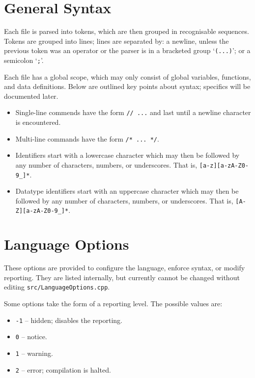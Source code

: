 \documentclass{article}
\begin{document}
\section{General Syntax}

Each file is parsed into tokens, which are then grouped in recognisable sequences.
Tokens are grouped into lines; lines are separated by: a newline, unless the previous token was an operator or the parser is in a bracketed group `\texttt{(...)}';
or a semicolon `\texttt{;}'.

Each file has a global scope, which may only consist of global variables, functions, and data definitions.
Below are outlined key points about syntax; specifics will be documented later.

\begin{itemize}
    \item Single-line commends have the form \texttt{// ...} and last until a newline character is encountered.
    \item Multi-line commands have the form \texttt{/* ... */}.
    \item Identifiers start with a lowercase character which may then be followed by any number of characters, numbers, or underscores.
    That is, \texttt{[a-z][a-zA-Z0-9\_]*}.
    \item Datatype identifiers start with an uppercase character which may then be followed by any number of characters, numbers, or underscores.
    That is, \texttt{[A-Z][a-zA-Z0-9\_]*}.
\end{itemize}

\section{Language Options}

These options are provided to configure the language, enforce syntax, or modify reporting.
They are listed internally, but currently cannot be changed without editing \texttt{src/LanguageOptions.cpp}.

Some options take the form of a reporting level.
The possible values are:
\begin{itemize}
    \item \texttt{-1} -- hidden; disables the reporting.
    \item \texttt{0} -- notice.
    \item \texttt{1} -- warning.
    \item \texttt{2} -- error; compilation is halted.
\end{itemize}
\end{document}
